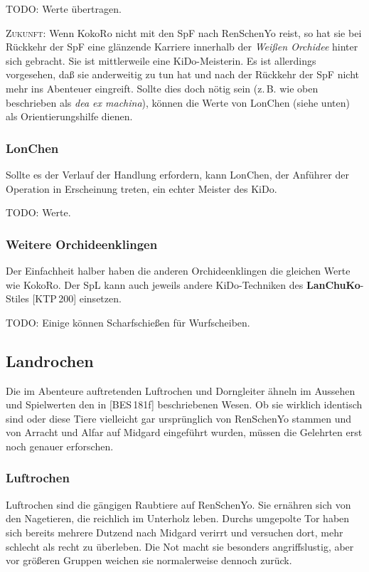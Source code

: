 \documentclass[
a4paper,
twoside,
DIV=calc,
BCOR=4mm,
fontsize=9pt,
twocolumn=on,
titlepage=on,
parskip=half
]{scrartcl}
\begin{document}

TODO: Werte übertragen.

\textsc{Zukunft:} Wenn KokoRo nicht mit den SpF nach RenSchenYo reist,
so hat sie bei Rückkehr der SpF eine glänzende Karriere innerhalb der
\emph{Weißen Orchidee} hinter sich gebracht. Sie ist mittlerweile eine
KiDo-Meisterin. Es ist allerdings vorgesehen, daß sie anderweitig zu
tun hat und nach der Rückkehr der SpF nicht mehr ins Abenteuer
eingreift. Sollte dies doch nötig sein (z.\,B. wie oben beschrieben
als \emph{dea ex machina}), können die Werte von LonChen (siehe
unten) als Orientierungshilfe dienen.


\subsubsection{LonChen}

Sollte es der Verlauf der Handlung erfordern, kann LonChen, der
Anführer der Operation in Erscheinung treten, ein echter Meister des
KiDo.

TODO: Werte.

\subsubsection{Weitere Orchideenklingen}

Der Einfachheit halber haben die anderen Orchideenklingen die
gleichen Werte wie KokoRo. Der SpL kann auch jeweils andere
KiDo-Techniken des \textbf{LanChuKo}-Stiles [KTP\,200] einsetzen.

TODO: Einige können Scharfschießen für Wurfscheiben.

\subsection{Landrochen}

Die im Abenteure auftretenden Luftrochen und Dorngleiter ähneln im
Aussehen und Spielwerten den in [BES\,181f] beschriebenen Wesen. Ob
sie wirklich identisch sind oder diese Tiere vielleicht gar
ursprünglich von RenSchenYo stammen und von Arracht und Alfar auf
Midgard eingeführt wurden, müssen die Gelehrten erst noch genauer
erforschen.

\subsubsection{Luftrochen}

Luftrochen sind die gängigen Raubtiere auf RenSchenYo. Sie ernähren
sich von den Nagetieren, die reichlich im Unterholz leben. Durchs
umgepolte Tor haben sich bereits mehrere Dutzend nach Midgard verirrt
und versuchen dort, mehr schlecht als recht zu überleben. Die Not
macht sie besonders angriffslustig, aber vor größeren Gruppen weichen
sie normalerweise dennoch zurück.
\end{document}
